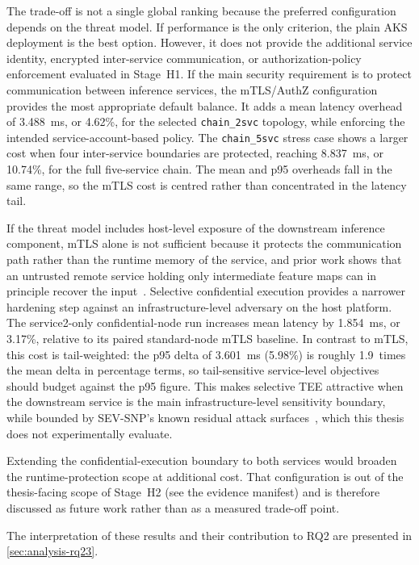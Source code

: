 The trade-off is not a single global ranking because the preferred configuration
depends on the threat model. If performance is the only criterion, the plain
AKS deployment is the best option. However, it does not provide the additional
service identity, encrypted inter-service communication, or
authorization-policy enforcement evaluated in Stage~H1. If the main security
requirement is to protect communication between inference services, the
mTLS/AuthZ configuration provides the most appropriate default balance. It
adds a mean latency overhead of 3.488~ms, or 4.62\%, for the selected
\texttt{chain\_2svc} topology, while enforcing the intended
service-account-based policy. The \texttt{chain\_5svc} stress case shows a larger
cost when four inter-service boundaries are protected, reaching 8.837~ms, or
10.74\%, for the full five-service chain. The mean and p95 overheads fall in the
same range, so the mTLS cost is centred rather than concentrated in the latency
tail.

If the threat model includes host-level exposure of the downstream inference
component, mTLS alone is not sufficient because it protects the communication
path rather than the runtime memory of the service, and prior work shows that
an untrusted remote service holding only intermediate feature maps can in
principle recover the input~\cite{he2021_attacking_collaborative}. Selective
confidential execution provides a narrower hardening step against an
infrastructure-level adversary on the host platform. The service2-only
confidential-node run increases mean latency by 1.854~ms, or 3.17\%, relative
to its paired standard-node mTLS baseline. In contrast to mTLS, this cost is
tail-weighted: the p95 delta of 3.601~ms (5.98\%) is roughly 1.9~times the mean
delta in percentage terms, so tail-sensitive service-level objectives should
budget against the p95 figure. This makes selective TEE attractive
when the downstream service is the main infrastructure-level sensitivity
boundary, while bounded by SEV-SNP's known residual attack
surfaces~\cite{schluter2024_heckler}, which this thesis does not
experimentally evaluate.

Extending the confidential-execution boundary to both services would broaden
the runtime-protection scope at additional cost. That configuration is out of
the thesis-facing scope of Stage~H2 (see the evidence manifest) and is therefore
discussed as future work rather than as a measured trade-off point.

The interpretation of these results and their contribution to RQ2 are presented in
\cref{sec:analysis-rq23}.
